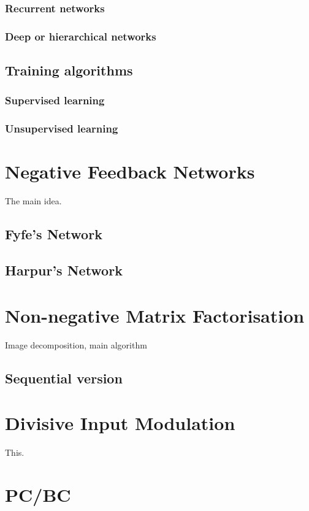 \documentclass[11pt,a4paper]{report}
\begin{document}
				\subsubsection{Recurrent networks}
				\subsubsection{Deep or hierarchical networks}
		
			\subsection{Training algorithms}
				\subsubsection{Supervised learning}
				\subsubsection{Unsupervised learning}
		
		\section{Negative Feedback Networks}
		The main idea.
			\subsection{Fyfe's Network}
			\subsection{Harpur's Network}
	
		\section{Non-negative Matrix Factorisation}
		Image decomposition, main algorithm
			\subsection{Sequential version}
	
		\section{Divisive Input Modulation}
		This.

		\section{PC/BC}
\end{document}
